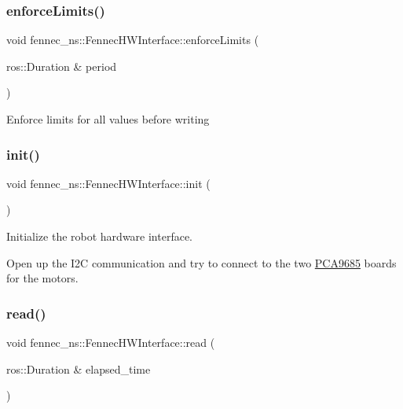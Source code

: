 \subsubsection{\texorpdfstring{enforce\+Limits()}{enforceLimits()}}
{\footnotesize\ttfamily void fennec\+\_\+ns\+::\+Fennec\+H\+W\+Interface\+::enforce\+Limits (\begin{DoxyParamCaption}\item[{ros\+::\+Duration \&}]{period }\end{DoxyParamCaption})\hspace{0.3cm}{\ttfamily [virtual]}}

Enforce limits for all values before writing \mbox{\label{classfennec__ns_1_1_fennec_h_w_interface_ad5e55d24cc4471e666f2e5e17977ca13}} 
\subsubsection{\texorpdfstring{init()}{init()}}
{\footnotesize\ttfamily void fennec\+\_\+ns\+::\+Fennec\+H\+W\+Interface\+::init (\begin{DoxyParamCaption}{ }\end{DoxyParamCaption})\hspace{0.3cm}{\ttfamily [virtual]}}



Initialize the robot hardware interface. 

Open up the I2C communication and try to connect to the two \hyperlink{class_p_c_a9685}{P\+C\+A9685} boards for the motors. \mbox{\label{classfennec__ns_1_1_fennec_h_w_interface_adb8bbfce4a97c7f0a007a6ddf933be7a}} 
\subsubsection{\texorpdfstring{read()}{read()}}
{\footnotesize\ttfamily void fennec\+\_\+ns\+::\+Fennec\+H\+W\+Interface\+::read (\begin{DoxyParamCaption}\item[{ros\+::\+Duration \&}]{elapsed\+\_\+time }\end{DoxyParamCaption})\hspace{0.3cm}{\ttfamily [virtual]}}



